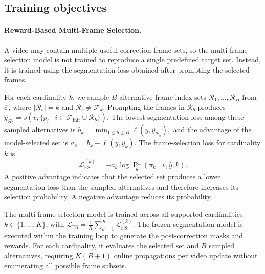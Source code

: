 \subsection{Training objectives}
\label{sec:training_objectives}

\paragraph{Reward-Based Multi-Frame Selection.}
A video may contain multiple useful correction-frame sets, so the
multi-frame selection model is not trained to reproduce a single predefined
target set. Instead, it is trained using the segmentation loss obtained after
prompting the selected frames.

For each cardinality \(k\), we sample \(B\) alternative frame-index sets
\(\mathcal{R}_1,\ldots,\mathcal{R}_B\) from \(\mathcal{E}\), where
\(\lvert\mathcal{R}_b\rvert=k\) and
\(\mathcal{R}_b\neq\mathcal{F}_k\). Prompting the frames in
\(\mathcal{R}_b\) produces
\(
\widehat{y}_{\mathcal{R}_b}
=
s\left(
v,
\{p_i\mid
i\in\mathcal{F}_{\mathrm{init}}\cup\mathcal{R}_b\}
\right).
\)
The lowest segmentation loss among these sampled alternatives is
\(
b_k
=
\min_{1\leq b\leq B}
\ell\left(y,\widehat{y}_{\mathcal{R}_b}\right),
\)
and the advantage of the model-selected set is
\(
a_k
=
b_k-\ell(y,\widehat{y}_k).
\)
The frame-selection loss for cardinality \(k\) is
\begin{equation}
\mathcal{L}^{(k)}_{\mathrm{FS}}
=
-a_k
\log
\Pr_{\theta}
\left(
\pi_k\mid v,\widehat{y},k
\right).
\label{eq:frame_selection_loss}
\end{equation}
A positive advantage indicates that the selected set produces a lower
segmentation loss than the sampled alternatives and therefore increases its
selection probability. A negative advantage reduces its probability.

The multi-frame selection model is trained across all supported
cardinalities \(k\in\{1,\ldots,K\}\), with
\(
\mathcal{L}_{\mathrm{FS}}
=
\frac{1}{K}
\sum_{k=1}^{K}
\mathcal{L}^{(k)}_{\mathrm{FS}}.
\label{eq:frame_selection_total_loss}
\)
The frozen segmentation model is executed within the training loop to
generate the post-correction masks and rewards. For each cardinality, it
evaluates the selected set and $B$ sampled alternatives, requiring
$K(B+1)$ online propagations per video update without enumerating all
possible frame subsets.
